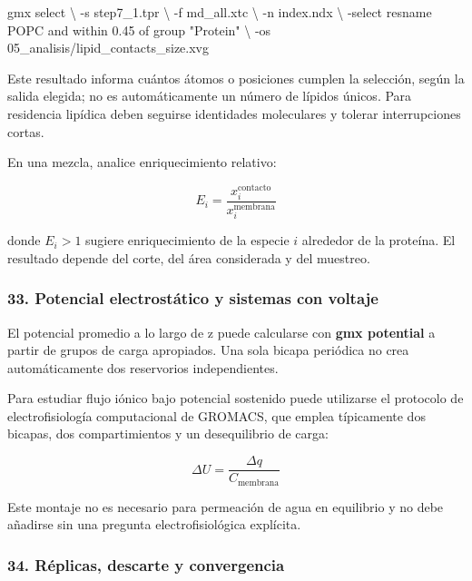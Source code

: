 \documentclass[
  spanish,
  11pt,
  a4paper]{article}
\newenvironment{Shaded}{\begin{snugshade}}{\end{snugshade}}
\newcommand{\AttributeTok}[1]{\textcolor[rgb]{0.13,0.29,0.53}{#1}}
\newcommand{\DataTypeTok}[1]{\textcolor[rgb]{0.13,0.29,0.53}{#1}}
\newcommand{\ExtensionTok}[1]{#1}
\newcommand{\NormalTok}[1]{#1}
\newcommand{\StringTok}[1]{\textcolor[rgb]{0.31,0.60,0.02}{#1}}
\begin{document}
\begin{Shaded}
\begin{Highlighting}[]
\ExtensionTok{gmx}\NormalTok{ select }\DataTypeTok{\textbackslash{}}
    \AttributeTok{{-}s}\NormalTok{ step7\_1.tpr }\DataTypeTok{\textbackslash{}}
    \AttributeTok{{-}f}\NormalTok{ md\_all.xtc }\DataTypeTok{\textbackslash{}}
    \AttributeTok{{-}n}\NormalTok{ index.ndx }\DataTypeTok{\textbackslash{}}
    \AttributeTok{{-}select} \StringTok{\textquotesingle{}resname POPC and within 0.45 of group "Protein"\textquotesingle{}} \DataTypeTok{\textbackslash{}}
    \AttributeTok{{-}os}\NormalTok{ 05\_analisis/lipid\_contacts\_size.xvg}
\end{Highlighting}
\end{Shaded}

Este resultado informa cuántos átomos o posiciones cumplen la selección,
según la salida elegida; no es automáticamente un número de lípidos
únicos. Para residencia lipídica deben seguirse identidades moleculares
y tolerar interrupciones cortas.

En una mezcla, analice enriquecimiento relativo:

\[
E_i=
\frac{x_i^{\mathrm{contacto}}}
     {x_i^{\mathrm{membrana}}}
\]

donde \(E_i>1\) sugiere enriquecimiento de la especie \(i\) alrededor de
la proteína. El resultado depende del corte, del área considerada y del
muestreo.

\subsubsection{33. Potencial electrostático y sistemas con
voltaje}\label{potencial-electrostuxe1tico-y-sistemas-con-voltaje}

El potencial promedio a lo largo de z puede calcularse con \textbf{gmx
potential} a partir de grupos de carga apropiados. Una sola bicapa
periódica no crea automáticamente dos reservorios independientes.

Para estudiar flujo iónico bajo potencial sostenido puede utilizarse el
protocolo de electrofisiología computacional de GROMACS, que emplea
típicamente dos bicapas, dos compartimientos y un desequilibrio de
carga:

\[
\Delta U=\frac{\Delta q}{C_{\mathrm{membrana}}}
\]

Este montaje no es necesario para permeación de agua en equilibrio y no
debe añadirse sin una pregunta electrofisiológica explícita.

\subsubsection{34. Réplicas, descarte y
convergencia}\label{ruxe9plicas-descarte-y-convergencia}
\end{document}

